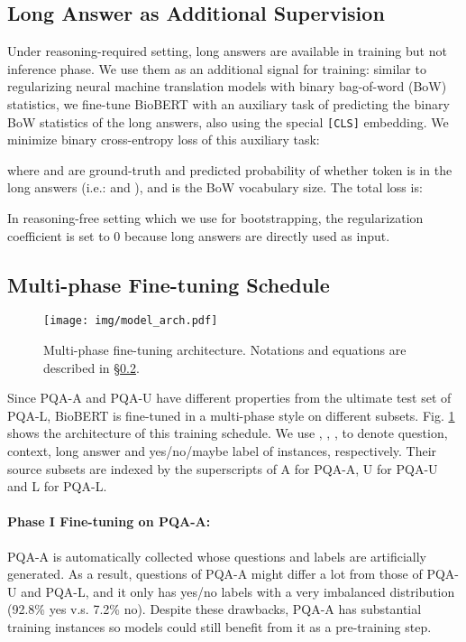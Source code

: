 \documentclass[11pt,a4paper]{article}
\begin{document}
\subsection{Long Answer as Additional Supervision}
Under reasoning-required setting, long answers are available in training but not inference phase. We use them as an additional signal for training: similar to \citet{ma2018bag} regularizing neural machine translation models with binary bag-of-word (BoW) statistics, we fine-tune BioBERT with an auxiliary task of predicting the binary BoW statistics of the long answers, also using the special {\tt [CLS]} embedding. We minimize binary cross-entropy loss of this auxiliary task:

where  and  are ground-truth and predicted probability of whether token  is in the long answers (i.e.:  and ), and  is the BoW vocabulary size. The total loss is:

In reasoning-free setting which we use for bootstrapping, the regularization coefficient  is set to 0 because long answers are directly used as input.

\subsection{Multi-phase Fine-tuning Schedule} \label{notation}
\begin{figure}
    \centering
    \texttt{[image: img/model\_arch.pdf]}
    \vskip -0.15cm
    \caption{Multi-phase fine-tuning architecture. Notations and equations are described in \S \ref{notation}.}
    \label{fig:arch}
    \vspace{-0.5em}
\end{figure}

Since PQA-A and PQA-U have different properties from the ultimate test set of PQA-L, BioBERT is fine-tuned in a multi-phase style on different subsets. Fig. \ref{fig:arch} shows the architecture of this training schedule. We use , , ,  to denote question, context, long answer and yes/no/maybe label of instances, respectively. Their source subsets are indexed by the superscripts of A for PQA-A, U for PQA-U and L for PQA-L.

\paragraph{Phase I Fine-tuning on PQA-A:}
PQA-A is automatically collected whose questions and labels are artificially generated. As a result, questions of PQA-A might differ a lot from those of PQA-U and PQA-L, and it only has yes/no labels with a very imbalanced distribution (92.8\% yes v.s. 7.2\% no). Despite these drawbacks, PQA-A has substantial training instances so models could still benefit from it as a pre-training step.
\end{document}
